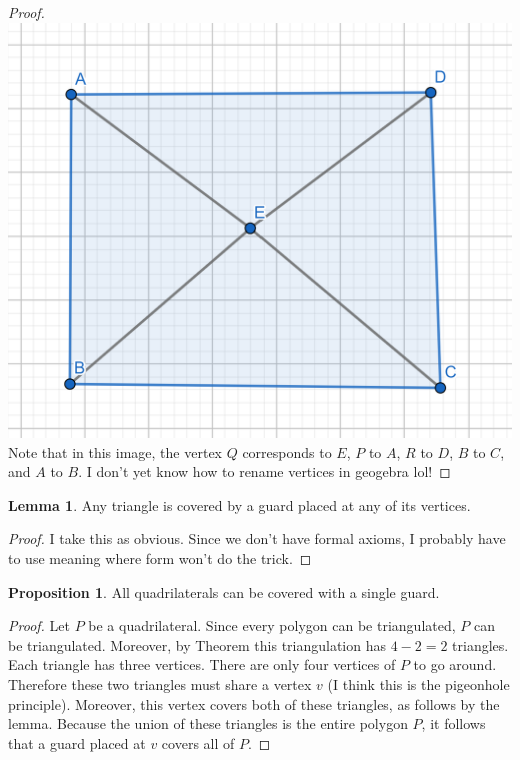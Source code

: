 \documentclass[12pt]{article}
\theoremstyle{definition}
\newtheorem{lemma}{Lemma}
\newtheorem{proposition}{Proposition}
\begin{document}
\begin{proof}
\includegraphics[scale=0.5]{four_triangles.png} 
Note that in this image, the vertex $Q$ corresponds to $E$, $P$ to $A$, $R$ to $D$, $B$ to $C$, and $A$ to $B$. I don't yet know how to rename vertices in geogebra lol! 
\end{proof}

\begin{lemma}
Any triangle is covered by a guard placed at any of its vertices.
\end{lemma}
\begin{proof}
I take this as obvious. Since we don't have formal axioms, I probably have to use meaning where form won't do the trick.
\end{proof}

\begin{proposition}
All quadrilaterals can be covered with a single guard.
\end{proposition}

\begin{proof}
 Let $P$ be a quadrilateral. Since every polygon can be triangulated, $P$ can be triangulated. Moreover, by Theorem  this triangulation has $4-2 = 2$ triangles. Each triangle has three vertices. There are only four vertices of $P$ to go around. Therefore these two triangles must share a vertex $v$ (I think this is the pigeonhole principle). Moreover, this vertex covers both of these triangles, as follows by the lemma. Because the union of these triangles is the entire polygon $P$, it follows that a guard placed at $v$ covers all of $P$.
\end{proof}
\end{document}
